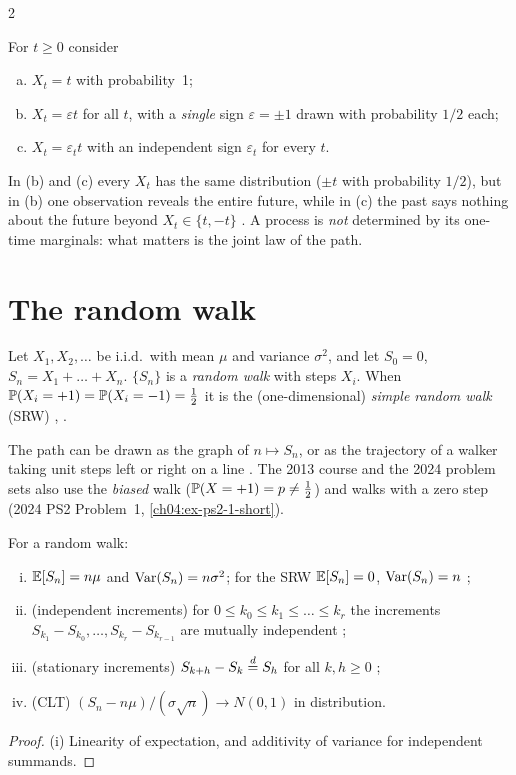 \begin{paracol}{2}
\begin{example}\label{ch04:ex-threeproc}
For $t\ge0$ consider
\begin{enumerate}[(a)]
  \item $X_t=t$ with probability~1;
  \item $X_t=\varepsilon t$ for all $t$, with a
      \emph{single} sign $\varepsilon=\pm1$ drawn with probability $1/2$ each;
  \item $X_t=\varepsilon_tt$ with an
      independent sign $\varepsilon_t$ for every $t$.
\end{enumerate}
In (b) and (c) every $X_t$ has the same distribution
($\pm t$ with probability $1/2$), but in (b) one observation reveals the entire future, while in (c) the
past says nothing about the future beyond $X_t\in\{t,-t\}$ . A process is \emph{not}
determined by its one-time marginals: what matters is the joint law of the path.
\end{example}

\section{The random walk}\label{ch04:sec-rw}

\begin{definition}\label{ch04:def-rw}
Let $X_1,X_2,\dots$ be i.i.d.\ with mean $\mu$ and variance $\sigma^2$, and let $S_0=0$,
$S_n=X_1+\dots+X_n$. $\{S_n\}$ is a \emph{random walk} with steps $X_i$. When
$\mathbb{P}(X_i=+1)=\mathbb{P}(X_i=-1)=\tfrac12$ it is the (one-dimensional) \emph{simple random walk} (SRW)
, .
\end{definition}

The path can be drawn as the graph of $n\mapsto S_n$, or as the trajectory of a walker taking unit steps
left or right on a line . The 2013 course and the 2024 problem sets also use the
\emph{biased} walk ($\mathbb{P}(X=+1)=p\ne\tfrac12$) and walks with a zero step (2024 PS2 Problem~1,
\cref{ch04:ex-ps2-1-short}).

\begin{proposition}\label{ch04:prop-rw}
For a random walk:
\begin{enumerate}[(i)]
  \item $\mathbb{E}[S_n]=n\mu$ and $\operatorname{Var}(S_n)=n\sigma^2$; for the SRW $\mathbb{E}[S_n]=0$, $\operatorname{Var}(S_n)=n$ ;
  \item (independent increments) for $0\le k_0\le k_1\le\dots\le k_r$ the increments
        $S_{k_1}-S_{k_0},\dots,S_{k_r}-S_{k_{r-1}}$ are mutually independent ;
  \item (stationary increments) $S_{k+h}-S_k\stackrel{d}{=} S_h$ for all $k,h\ge0$ ;
  \item (CLT) $(S_n-n\mu)/(\sigma\sqrt n)\to N(0,1)$ in distribution.
\end{enumerate}
\end{proposition}
\begin{proof}
(i) Linearity of expectation, and additivity of variance for independent summands.


\end{proof}
\end{paracol}
